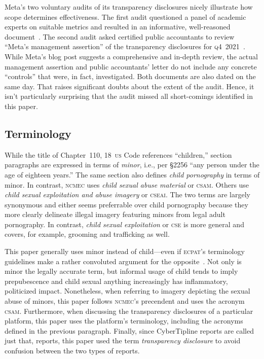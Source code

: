 \documentclass[nonacm,screen]{acmart}
\newcommand\V[1]{\textsc{\MakeLowercase{#1}}}
\begin{document}
\begin{itemize}
{Meta's two voluntary audits of its transparency disclosures nicely
illustrate how scope determines effectiveness. The first audit questioned a
panel of academic experts on suitable metrics and resulted in an informative,
well-reasoned document~\cite{BradfordGriselea2019,Plumb2019}. The second audit
asked certified public accountants to review ``Meta's management assertion'' of
the transparency disclosures for \V{Q4}~2021~\cite{Meta2022,Sarang2022}. While
Meta's blog post suggests a comprehensive and in-depth review, the actual
management assertion and public accountants' letter do not include any concrete
``controls'' that were, in fact, investigated. Both documents are also dated on
the same day. That raises significant doubts about the extent of the audit.
Hence, it isn't particularly surprising that the audit missed all short-comings
identified in this paper.


\subsection{Terminology}
\label{sec:terminology}

While the title of Chapter~110, 18~\V{US} Code references ``children,'' section
paragraphs are expressed in terms of \emph{minor}, i.e., per \S2256 ``any person
under the age of eighteen years.'' The same section also defines \emph{child
pornography} in terms of minor. In contrast, \V{NCMEC} uses \emph{child sexual
abuse material} or \V{CSAM}. Others use \emph{child sexual exploitation and
abuse imagery} or \V{CSEAI}. The two terms are largely synonymous and either
seems preferrable over child pornography because they more clearly delineate
illegal imagery featuring minors from legal adult pornography. In contrast,
\emph{child sexual exploitation} or \V{CSE} is more general and covers, for
example, grooming and trafficking as well.

This paper generally uses minor instead of child---even if \V{ECPAT}'s
terminology guidelines make a rather convoluted argument for the
opposite~\cite{GreijerDoek2016}. Not only is minor the legally accurate term,
but informal usage of child tends to imply prepubescence and child sexual
anything increasingly has inflammatory, politicized impact. Nonetheless, when
referring to imagery depicting the sexual abuse of minors, this paper follows
\V{NCMEC}'s precendent and uses the acronym \V{CSAM}. Furthermore, when
discussing the transparency disclosures of a particular platform, this paper
uses the platform's terminology, including the acronyms defined in the previous
paragraph. Finally, since CyberTipline reports are called just that, reports,
this paper used the term \emph{transparency disclosure} to avoid confusion
between the two types of reports.

}
\end{itemize}
\end{document}

